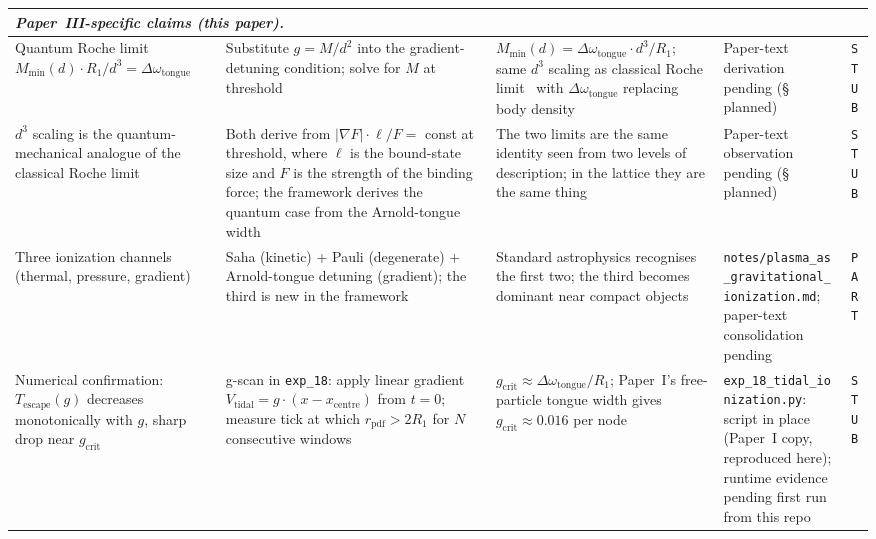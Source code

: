 {\begin{longtable}{@{}p{2.8cm}p{3.6cm}p{3.6cm}p{4.0cm}p{1.0cm}@{}}
\hline
\multicolumn{5}{l}{\textit{Paper~III-specific claims (this paper).}} \\
\hline

Quantum Roche limit $M_\text{min}(d) \cdot R_1 / d^3 =
\Delta\omega_\text{tongue}$
    & Substitute $g = M / d^2$ into the gradient-detuning condition;
      solve for $M$ at threshold
    & $M_\text{min}(d) = \Delta\omega_\text{tongue} \cdot d^3 / R_1$;
      same $d^3$ scaling as classical Roche limit~\cite{roche1849}
      with $\Delta\omega_\text{tongue}$ replacing body density
    & Paper-text derivation pending (\S\,planned)
    & \texttt{STUB} \\

$d^3$ scaling is the quantum-mechanical analogue of the classical
Roche limit
    & Both derive from $|\nabla F| \cdot \ell / F = $ const at
      threshold, where $\ell$ is the bound-state size and $F$ is
      the strength of the binding force; the framework derives the
      quantum case from the Arnold-tongue width
    & The two limits are the same identity seen from two levels of
      description; in the lattice they are the same thing
    & Paper-text observation pending (\S\,planned)
    & \texttt{STUB} \\

Three ionization channels (thermal, pressure, gradient)
    & Saha (kinetic) + Pauli (degenerate) + Arnold-tongue
      detuning (gradient); the third is new in the framework
    & Standard astrophysics recognises the first two; the third
      becomes dominant near compact objects
    & \texttt{notes/plasma\_as\_gravitational\_ionization.md};
      paper-text consolidation pending
    & \texttt{PART} \\

Numerical confirmation:
$T_\text{escape}(g)$ decreases monotonically with $g$, sharp drop
near $g_\text{crit}$
    & g-scan in \texttt{exp\_18}: apply linear gradient
      $V_\text{tidal} = g \cdot (x - x_\text{centre})$ from
      $t = 0$; measure tick at which $r_\text{pdf} > 2 R_1$ for
      $N$ consecutive windows
    & $g_\text{crit} \approx \Delta\omega_\text{tongue} / R_1$;
      Paper~I's free-particle tongue width gives
      $g_\text{crit} \approx 0.016$ per node
    & \texttt{exp\_18\_tidal\_ionization.py}: script in place
      (Paper~I copy, reproduced here); runtime evidence pending
      first run from this repo
    & \texttt{STUB} \\


\end{longtable}}
